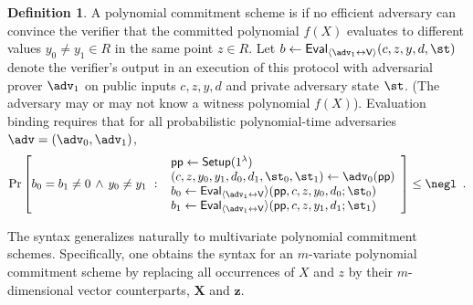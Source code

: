 \documentclass{article}
\theoremstyle{definition}
\newtheorem{definition}{Definition}
\newcommand{\alaninline}[1]{{\todo[color=blue!20!white, inline]{Alan: #1}}}
\newcommand{\alaninline}[1]{}
\begin{document}
\begin{definition}
A polynomial commitment scheme is  if no efficient adversary can convince the verifier that the committed polynomial $f(X)$ evaluates to different values $y_0 \neq y_1 \in R$ in the same point $z \in R$. Let $b \gets \pro{Eval}_{\langle \adv_1 \leftrightarrow \mathsf{V}\rangle}(c, z, y, d, \st)$ denote the verifier's output in an execution of this protocol with adversarial prover $\adv_1$ on public inputs $c, z, y, d$ and private adversary state $\st$. (The adversary may or may not know a witness polynomial $f(X)$). Evaluation binding requires that for all probabilistic polynomial-time adversaries $\adv = (\adv_0, \adv_1)$,
\[
    \Pr\left[
         b_0 = b_1 \neq 0 \, \wedge \, y_0 \neq y_1 \ 
         : \
       \begin{array}{l}
            \params \gets \pro{Setup}(1^\lambda) \\
            (c, z, y_0, y_1, d_0, d_1, \st_0, \st_1) \gets \adv_0(\params) \\
            b_0 \gets \pro{Eval}_{\langle \adv_1 \leftrightarrow \mathsf{V}} \rangle(\params, c, z, y_0, d_0; \st_0) \\
            b_1 \gets \pro{Eval}_{\langle \adv_1 \leftrightarrow \mathsf{V}} \rangle(\params, c, z, y_1, d_1; \st_1) \\
        \end{array}
    \right] \leq \negl \enspace .
\]
\end{definition}

The syntax generalizes naturally to multivariate polynomial commitment schemes. Specifically, one obtains the syntax for an $m$-variate polynomial commitment scheme by replacing all occurrences of $X$ and $z$ by their $m$-dimensional vector counterparts, $\mathbf{X}$ and $\mathbf{z}$.



\end{document}
